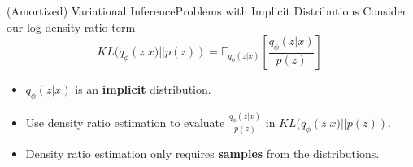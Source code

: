 \documentclass[handout]{beamer}
\newcommand{\E}{\mathbb{E}}
\begin{document}
\begin{frame}{(Amortized) Variational Inference}{Problems with Implicit Distributions}
Consider our log density ratio term
\[KL(q_\phi(z|x)||p(z))=\E_{q_\phi(z|x)}\left[\frac{q_\phi(z|x)}{p(z)}\right].\]
\begin{itemize}
\item $q_\phi(z|x)$ is an \textbf{implicit} distribution.
\vspace{0.2cm}
\item Use density ratio estimation to evaluate $\frac{q_\phi(z|x)}{p(z)}$ in $KL(q_\phi(z|x)||p(z))$.
\vspace{0.2cm}
\item Density ratio estimation only requires \textbf{samples} from the distributions.
\end{itemize}
\end{frame}
\end{document}
